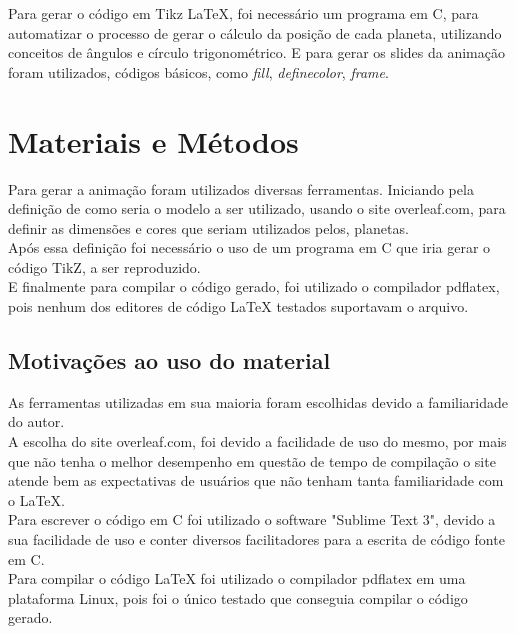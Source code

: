 \documentclass[
	12pt,				%
	openright,			%
	oneside,
	a4paper,			%
	english,			%
	french,				%
	spanish,			%
	brazil,				%
	]{abntex2}
\begin{document}
Para gerar o código em Tikz LaTeX, foi necessário um programa em C, para automatizar o processo de gerar o cálculo da posição de cada planeta, utilizando conceitos de ângulos e círculo trigonométrico. E para gerar os slides da animação foram utilizados, códigos básicos, como \textit{fill}, \textit{definecolor}, \textit{frame}.




\chapter[Materiais e Métodos]{Materiais e Métodos}

Para gerar a animação foram utilizados diversas ferramentas. Iniciando pela definição de como seria o modelo a ser utilizado, usando o site overleaf.com, para definir as dimensões e cores que seriam utilizados pelos, planetas. \\
\indent Após essa definição foi necessário o uso de um programa em C que iria gerar o código TikZ, a ser reproduzido. \\
\indent E finalmente para compilar o código gerado, foi utilizado o compilador pdflatex, pois nenhum dos editores de código LaTeX testados suportavam o arquivo.

\section{Motivações ao uso do material}

 As ferramentas utilizadas em sua maioria foram escolhidas devido a familiaridade do autor.
 \\ \indent A escolha do site overleaf.com, foi devido a facilidade de uso do mesmo, por mais que não tenha o melhor desempenho em questão de tempo de compilação o site atende bem as expectativas de usuários que não tenham tanta familiaridade com o LaTeX.
 \\ \indent Para escrever o código em C foi utilizado o software "Sublime Text 3", devido a sua facilidade de uso e conter diversos facilitadores para a escrita de código fonte em C.
 \\ \indent Para compilar o código LaTeX foi utilizado o compilador pdflatex em uma plataforma Linux, pois foi o único testado que conseguia compilar o código gerado.


\end{document}
